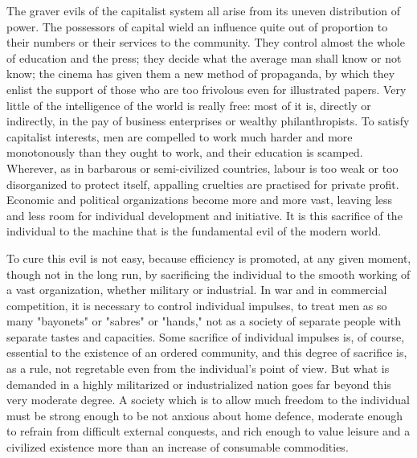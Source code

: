 The graver evils of the capitalist system all arise from its uneven distribution of power. The possessors of capital wield an influence quite out of proportion to their numbers or their services to the community. They control almost the whole of education and the press; they decide what the average man shall know or not know; the cinema has given them a new method of propaganda, by which they enlist the support of those who are too frivolous even for illustrated papers. Very little of the intelligence of the world is really free: most of it is, directly or indirectly, in the pay of business enterprises or wealthy philanthropists. To satisfy capitalist interests, men are compelled to work much harder and more monotonously than they ought to work, and their education is scamped. Wherever, as in barbarous or semi-civilized countries, labour is too weak or too disorganized to protect itself, appalling cruelties are practised for private profit. Economic and political organizations become more and more vast, leaving less and less room for individual development and initiative. It is this sacrifice of the individual to the machine that is the fundamental evil of the modern world.

To cure this evil is not easy, because efficiency is promoted, at any given moment, though not in the long run, by sacrificing the individual to the smooth working of a vast organization, whether military or industrial. In war and in commercial competition, it is necessary to control individual impulses, to treat men as so many "bayonets" or "sabres" or "hands," not as a society of separate people with separate tastes and capacities. Some sacrifice of individual impulses is, of course, essential to the existence of an ordered community, and this degree of sacrifice is, as a rule, not regretable even from the individual's point of view. But what is demanded in a highly militarized or industrialized nation goes far beyond this very moderate degree. A society which is to allow much freedom to the individual must be strong enough to be not anxious about home defence, moderate enough to refrain from difficult external conquests, and rich enough to value leisure and a civilized existence more than an increase of consumable commodities.


